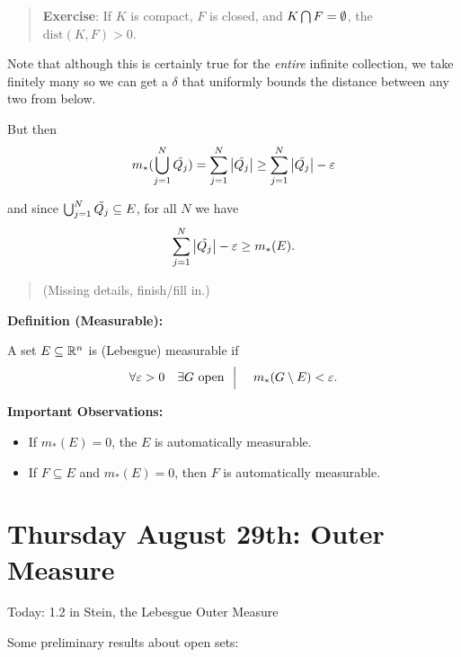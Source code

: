 \begin{quote}
\textbf{Exercise}: If \(K\) is compact, \(F\) is closed, and
\(K \bigcap F = \emptyset\), the \(\mathrm{dist}(K, F) > 0\).
\end{quote}

Note that although this is certainly true for the \emph{entire} infinite
collection, we take finitely many so we can get a \(\delta\) that
uniformly bounds the distance between any two from below.

But then
\begin{align*}
m_*(\bigcup_{j=1}^N \tilde{Q_j}) = \sum_{j=1}^N {\left\lvert {\tilde{Q_j}} \right\rvert} \geq \sum_{j=1}^N {\left\lvert {\tilde{Q_j}} \right\rvert} - \varepsilon
\end{align*}

and since \(\bigcup_{j=1}^N \tilde{Q_j} \subseteq E\), for all \(N\) we
have
\begin{align*}
\sum_{j=1}^N {\left\lvert {\tilde{Q_j}} \right\rvert} -\varepsilon \geq m_*(E)
.\end{align*}

\begin{quote}
(Missing details, finish/fill in.)
\end{quote}

\textbf{Definition (Measurable):}

A set \(E\subseteq {\mathbb{R}}^n\) is (Lebesgue) measurable if
\begin{align*}
\forall \varepsilon >0 \quad \exists G ~\text{open}~ {~\mathrel{\Big|}~} \quad m_*(G\setminus E) < \varepsilon.
\end{align*}

\textbf{Important Observations:}

\begin{itemize}
\item
  If \(m_*(E) = 0\), the \(E\) is automatically measurable.
\item
  If \(F\subseteq E\) and \(m_*(E) = 0\), then \(F\) is automatically
  measurable.
\end{itemize}

\hypertarget{thursday-august-29th-outer-measure}{%
\section{Thursday August 29th: Outer
Measure}\label{thursday-august-29th-outer-measure}}

Today: 1.2 in Stein, the Lebesgue Outer Measure

Some preliminary results about open sets:

